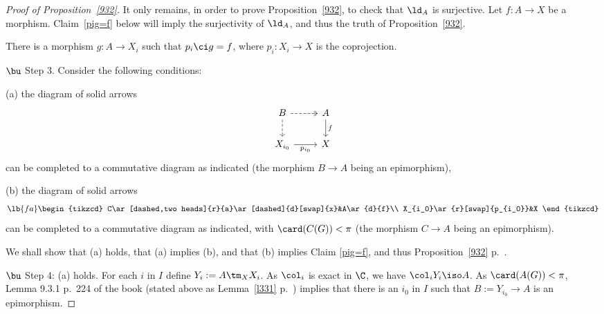\documentclass[12pt]{article}
\theoremstyle{remark}
\theoremstyle{definition}
\begin{document}
\begin{proof}[Proof of Proposition~\ref{932}]
It only remains, in order to prove Proposition~\ref{932}, to check that $\ld_A$ is surjective. Let $f:A\to X$ be a morphism. Claim~\ref{pig=f} below will imply the surjectivity of $\ld_A$, and thus the truth of Proposition~\ref{932}. 

\begin{claim} 
There is a morphism $g:A\to X_i$ such that $p_i\ci g=f$, where $p_i:X_i\to X$ is the coprojection.
\end{claim} 

\nn$\bu$ Step 3. Consider the following conditions: 

\nn(a) the diagram of solid arrows 
$$
\begin{tikzcd}
B\ar[dashed,two heads]{r}\ar[dashed]{d}&A\ar{d}{f}\\ 
X_{i_0}\ar{r}[swap]{p_{i_0}}&X
\end{tikzcd}
$$
can be completed to a commutative diagram as indicated (the morphism $B\to A$ being an epimorphism),

\nn(b) the diagram of solid arrows 
\begin{equation}\lb{fa}
\begin{tikzcd}
C\ar[dashed,two heads]{r}{a}\ar[dashed]{d}[swap]{x}&A\ar{d}{f}\\ 
X_{i_0}\ar{r}[swap]{p_{i_0}}&X
\end{tikzcd}
\end{equation} 
can be completed to a commutative diagram as indicated, with $\card(C(G))<\pi$ (the morphism $C\to A$ being an epimorphism).

We shall show that (a) holds, that (a) implies (b), and that (b) implies Claim \ref{pig=f}, and thus Proposition~\ref{932} p.~.%

\nn$\bu$ Step 4: (a) holds. For each $i$ in $I$ define $Y_i:=A\tm_XX_i$. As $\col_i$ is exact in $\C$, we have $\col_iY_i\iso A$. As $\card(A(G))<\pi$, Lemma 9.3.1 p.~224 of the book (stated above as Lemma~\ref{l331} p.~) implies that there is an $i_0$ in $I$ such that $B:=Y_{i_0}\to A$ is an epimorphism.


\end{proof}
\end{document}
